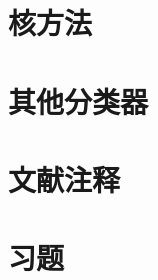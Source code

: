\pending

\section{核方法}

\pending

\section{其他分类器}

\pending

\section{文献注释}

\pending

\section{习题}

\pending
